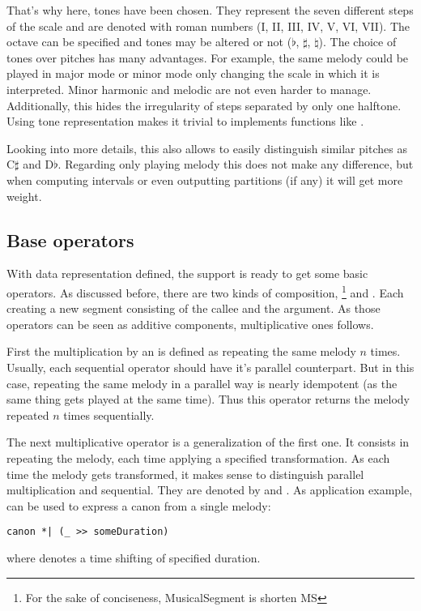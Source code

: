 \documentclass[preprint]{sigplanconf}
\begin{document}
That's why here, tones have been chosen. They represent the seven different steps of the scale and are denoted with roman numbers (I, II, III, IV, V, VI, VII). The octave can be specified and tones may be altered or not ($\flat$, $\sharp$, $\natural$). The choice of tones over pitches has many advantages.
For example, the same melody could be played in major mode or minor mode only changing the scale in which it is interpreted. Minor harmonic and melodic are not even harder to manage. Additionally, this hides the irregularity of steps separated by only one halftone. Using tone representation makes it trivial to implements functions like .

Looking into more details, this also allows to easily distinguish similar pitches as C$\sharp$ and D$\flat$. Regarding only playing melody this does not make any difference, but when computing intervals or even outputting partitions (if any) it will get more weight.


\subsection{Base operators}

With data representation defined, the support is ready to get some basic operators. As discussed before, there are two kinds of composition, \footnote{For the sake of conciseness, MusicalSegment is shorten MS} and . Each creating a new segment consisting of the callee and the argument. As those operators can be seen as additive components, multiplicative ones follows.

First the multiplication by an  is defined as repeating the same melody $n$ times. Usually, each sequential operator should have it's parallel counterpart. But in this case, repeating the same melody in a parallel way is nearly idempotent (as the same thing gets played at the same time). Thus this operator returns the melody repeated $n$ times sequentially.

The next multiplicative operator is a generalization of the first one. It consists in repeating the melody, each time applying a specified transformation. As each time the melody gets transformed, it makes sense to distinguish parallel multiplication and sequential. They are denoted by \lln{*+} and \lln{*|}.
As application example, \lln{*|} can be used to express a canon from a single melody: 
\begin{lstlisting}
canon *| (_ >> someDuration) 
\end{lstlisting}
where \lln{>>} denotes a time shifting of specified duration.
\end{document}
